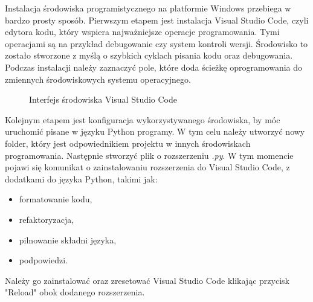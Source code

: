 Instalacja środowiska programistycznego na platformie Windows przebiega w bardzo prosty sposób. 
Pierwszym etapem jest instalacja Visual Studio Code, czyli edytora kodu, który wspiera najważniejsze operacje programowania. Tymi operacjami są na przykład debugowanie czy system kontroli wersji. Środowisko to zostało stworzone z myślą o szybkich cyklach pisania kodu oraz debugowania. Podczas instalacji należy zaznaczyć pole, które doda ścieżkę oprogramowania do zmiennych środowiskowych systemu operacyjnego.
\begin{figure}[h!]
  \centering
  \caption{Interfejs środowiska Visual Studio Code}
  \label{fig:srodowiskoPracyVs}
\end{figure}

Kolejnym etapem jest konfiguracja wykorzystywanego środowiska, by móc uruchomić pisane w języku Python programy. W tym celu należy utworzyć nowy folder, który jest odpowiednikiem projektu w innych środowiskach programowania. Następnie stworzyć plik o rozszerzeniu \textit{.py}. W tym momencie pojawi się komunikat o zainstalowaniu rozszerzenia do Visual Studio Code, z dodatkami do języka Python, takimi jak:
\begin{itemize}
    \item formatowanie kodu,
    \item refaktoryzacja,
    \item pilnowanie składni języka,
    \item podpowiedzi.
\end{itemize}
Należy go zainstalować oraz zresetować Visual Studio Code klikając przycisk "Reload" obok dodanego rozszerzenia.


